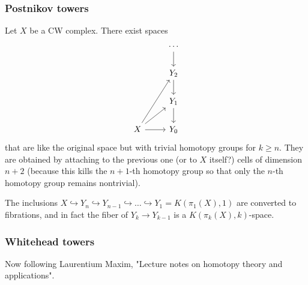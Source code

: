 \subsubsection{Postnikov towers}
Let $X$ be a CW complex. There exist spaces
\[\begin{tikzcd}
	&\cdots\arrow[d]\\
	&Y_{2}\arrow[d]\\
	&Y_{1}\arrow[d]\\
	X\arrow[uur]\arrow[ur]\arrow[r]&Y_{0}
\end{tikzcd}\]
that are like the original space but with trivial homotopy groups for $k\geq n$. They are obtained by attaching to the previous one {\color{blue}(or to $X$ itself?)} cells of dimension $n+2$ (because this kills the $n+1$-th homotopy group so that only the $n$-th homotopy group remains nontrivial).

The inclusions $X\hookrightarrow Y_{n}\hookrightarrow Y_{n-1}\hookrightarrow \ldots\hookrightarrow Y_{1}=K(\pi_{1}(X),1)$ are converted to fibrations, and in fact the fiber of $Y_{k}\to Y_{k-1}$ is a $K(\pi_{k}(X),k)$-space.

\subsubsection{Whitehead towers}

Now following Laurentium Maxim, "Lecture notes on homotopy theory and applications".

